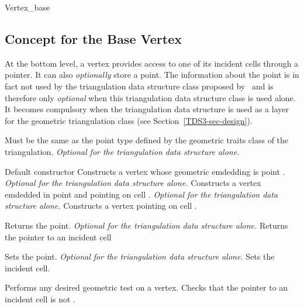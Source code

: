 	\begin{ccClass}{Vertex_base}
	\subsection{Concept for the Base Vertex}


At the bottom level, a vertex provides access to
one of its incident cells through a  pointer. 
It can also \textit{optionally} store a point. The
information about the point is in fact not used by the triangulation
data structure class proposed by \cgal\ and is therefore only
\textit{optional} when this triangulation data structure class is used
alone. It becomes compulsory when the 
triangulation data structure is used as a layer for the geometric
triangulation class (see Section~\ref{TDS3-sec-design}).

\ccTypes
{}
{Must be the same as the point type  defined by the
geometric traits class of the triangulation. {\textit{Optional for the
triangulation data structure alone.}}} 

\ccCreation

{Default constructor}
\ccGlue
{}
{Constructs a vertex whose geometric emdedding is point
. {\textit{Optional for the triangulation data structure
alone.}}} 
\ccGlue
{}
{Constructs a vertex emdedded in point  and pointing on cell
. {\textit{Optional for the triangulation data structure alone.}}}
\ccGlue
{}
{Constructs a vertex pointing on cell .}

\ccAccessFunctions

{Returns the point. {\textit{Optional for the triangulation data
structure alone.}}} 
\ccGlue
{}
{Returns the pointer to an incident cell}


{Sets the point. {\textit{Optional for the triangulation data
structure alone.}}} 
\ccGlue
{}
{Sets the incident cell.}

{Performs any desired geometric test on a vertex. Checks that the
pointer to an incident cell is not .}


\end{ccClass}
